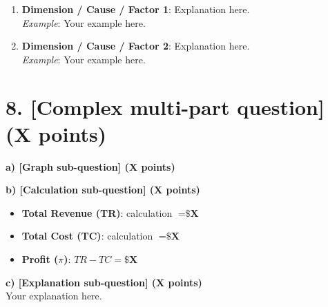 \documentclass[11pt, letterpaper]{article}
\begin{document}
\begin{enumerate}[leftmargin=*]
    \item \textbf{Dimension / Cause / Factor 1}: Explanation here. \\
    \textit{Example}: Your example here.
    \item \textbf{Dimension / Cause / Factor 2}: Explanation here. \\
    \textit{Example}: Your example here.
\end{enumerate}

\section*{8. [Complex multi-part question] (X points)}

\textbf{a) [Graph sub-question] (X points)}
\begin{center}
\end{center}

\textbf{b) [Calculation sub-question] (X points)}
\begin{itemize}[leftmargin=*, noitemsep]
    \item \textbf{Total Revenue (TR)}: calculation $= \textbf{\$X}$
    \item \textbf{Total Cost (TC)}: calculation $= \textbf{\$X}$
    \item \textbf{Profit ($\pi$)}: $TR - TC = \textbf{\$X}$
\end{itemize}

\textbf{c) [Explanation sub-question] (X points)} \\
Your explanation here.
\end{document}
